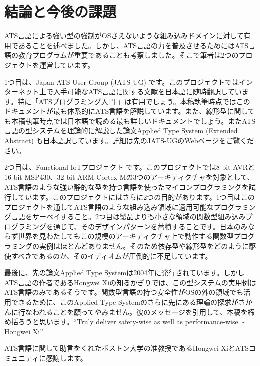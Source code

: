 \documentclass{ipsjprosym}
\begin{document}
\section{結論と今後の課題}

ATS言語による強い型の強制がOSさえないような組み込みドメインに対して有用であることを述べました。しかし、ATS言語の力を普及させるためにはATS言語の教育プログラムが重要であることも考察しました。そこで筆者は2つのプロジェクトを運営しています。

1つ目は、Japan ATS User Group (JATS-UG) \cite{jats-ug} です。このプロジェクトではインターネット上で入手可能なATS言語に関する文献を日本語に随時翻訳しています。特に「ATSプログラミング入門 \cite{INT2PROGINATS-J}」は有用でしょう。本稿執筆時点ではこのドキュメントが最も体系的にATS言語を解説しています。また、線形型に関しても本稿執筆時点では日本語で読める最も詳しいドキュメントでしょう。またATS言語の型システムを理論的に解説した論文Applied Type System (Extended Abstract) \cite{ATStypes03} も日本語訳しています。詳細は先のJATS-UGのWebページをご覧ください。

2つ目は、Functional IoTプロジェクト \cite{fpiot} です。このプロジェクトでは8-bit AVRと16-bit MSP430、32-bit ARM Cortex-Mの3つのアーキティクチャを対象として、ATS言語のような強い静的な型を持つ言語を使ったマイコンプログラミングを試行しています。このプロジェクトにはさらに2つの目的があります。1つ目はこのプロジェクトを通してATS言語のような組み込み領域に適用可能なプログラミング言語をサーベイすること。2つ目は製品よりも小さな領域の関数型組み込みプログラミングを通じて、そのデザインパターンを蓄積することです。日本のみならず世界を見わたしてもこの規模のアーキティクチャ上で動作する関数型プログラミングの実例はほとんどありません。そのため依存型や線形型をどのように駆使すべきであるのか、そのイディオムが圧倒的に不足しています。

最後に、先の論文Applied Type Systemは2004年に発行されています。しかしATS言語の作者であるHongwei Xiの知るかぎりでは、この型システムの実用例はATS言語のみであるそうです。関数型言語の持つ安全性がOSの外の領域でも活用できるために、このApplied Type Systemのさらに先にある理論の探求がさかんに行なわれることを願ってやみません。彼のメッセージを引用して、本稿を締め括ろうと思います。``Truly deliver safety-wise as well as performance-wise. - Hongwei Xi''

\begin{acknowledgment}
ATS言語に関して助言をくれたボストン大学の准教授であるHongwei XiとATSコミュニティに感謝します。
\end{acknowledgment}
\end{document}

